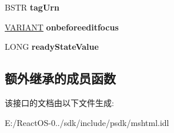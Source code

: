 \begin{DoxyCompactItemize}
B\+S\+TR {\bfseries tag\+Urn}
\item 
\mbox{\label{interface_m_s_h_t_m_l_1_1_i_h_t_m_l_element2_aa2afaf460f2f7297dd02c5d8f9fb798f}} 
\hyperlink{structtag_v_a_r_i_a_n_t}{V\+A\+R\+I\+A\+NT} {\bfseries onbeforeeditfocus}
\item 
\mbox{\label{interface_m_s_h_t_m_l_1_1_i_h_t_m_l_element2_ac1fff2dfe0836bbae027f14a067a4803}} 
L\+O\+NG {\bfseries ready\+State\+Value}
\end{DoxyCompactItemize}
\subsection*{额外继承的成员函数}


该接口的文档由以下文件生成\+:\begin{DoxyCompactItemize}
\item 
E\+:/\+React\+O\+S-\/0../sdk/include/psdk/mshtml.\+idl\end{DoxyCompactItemize}
